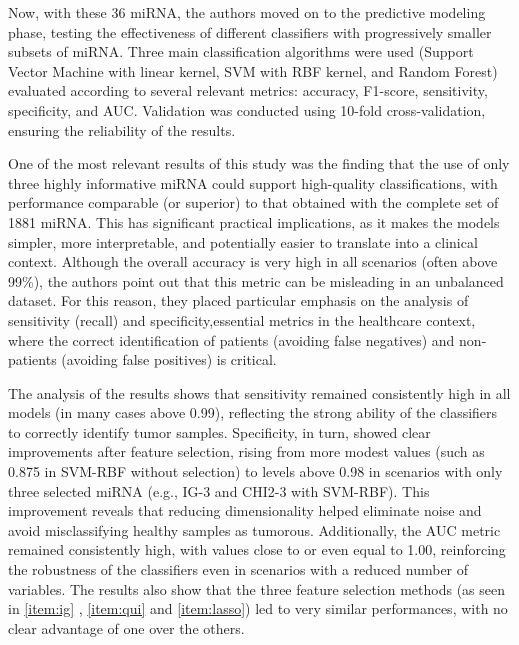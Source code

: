 Now, with these 36 miRNA, the authors moved on to the predictive modeling
phase, testing the effectiveness of different classifiers with progressively
smaller subsets of miRNA. Three main classification algorithms were used
(Support Vector Machine with linear kernel, SVM with RBF kernel, and Random
Forest) evaluated according to several relevant metrics: accuracy, F1-score,
sensitivity, specificity, and AUC. Validation was conducted using 10-fold
cross-validation, ensuring the reliability of the results.

One of the most relevant results of this study was the finding that the use of
only three highly informative miRNA could support high-quality
classifications, with performance comparable (or superior) to that obtained
with the complete set of 1881 miRNA. This has significant practical
implications, as it makes the models simpler, more interpretable, and
potentially easier to translate into a clinical context. Although the overall
accuracy is very high in all scenarios (often above 99\%), the authors point
out that this metric can be misleading in an unbalanced dataset. For this
reason, they placed particular emphasis on the analysis of sensitivity (recall)
and specificity,essential metrics in the healthcare context, where the correct
identification of patients (avoiding false negatives) and non-patients
(avoiding false positives) is critical.

The analysis of the results shows that sensitivity remained consistently high
in all models (in many cases above 0.99), reflecting the strong ability of the
classifiers to correctly identify tumor samples. Specificity, in turn, showed
clear improvements after feature selection, rising from more modest values
(such as 0.875 in SVM-RBF without selection) to levels above 0.98 in scenarios
with only three selected miRNA (e.g., IG-3 and CHI2-3 with SVM-RBF). This
improvement reveals that reducing dimensionality helped eliminate noise and
avoid misclassifying healthy samples as tumorous. Additionally, the AUC metric
remained consistently high, with values close to or even equal to 1.00,
reinforcing the robustness of the classifiers even in scenarios with a reduced
number of variables. The results also show that the three feature selection
methods (as seen in \ref{item:ig} , \ref{item:qui} and \ref{item:lasso}) led to
very similar performances, with no clear advantage of one over the others.

